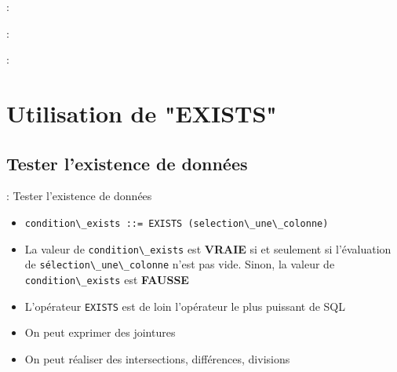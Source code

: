 \documentclass[10pt]{beamer}
\begin{document}
\begin{frame}{\secname : \subsecname}
    
\end{frame}

\begin{frame}{\secname : \subsecname}
    
\end{frame}

\begin{frame}{\secname : \subsecname}
    
\end{frame}

\section{Utilisation de "EXISTS"}
\tocss
\subsection{Tester l'existence de données}

\begin{frame}{\secname : \subsecname}
    Tester l'existence de données
    \begin{itemize}
        \item \lstinline[language=bnf]!condition\_exists ::= EXISTS (selection\_une\_colonne)!
        \item La valeur de \lstinline[language=bnf]!condition\_exists! est \textbf{VRAIE} si et seulement si l'évaluation de \lstinline[language=bnf]!sélection\_une\_colonne! n'est pas vide.  Sinon, la valeur de \lstinline[language=bnf]!condition\_exists! est \textbf{FAUSSE}
        \item L'opérateur \lstinline[language=plsql]!EXISTS! est de loin l'opérateur le plus puissant de SQL
        \item On peut exprimer des jointures
        \item On peut réaliser des intersections, différences, divisions
    \end{itemize}
\end{frame}
\end{document}
